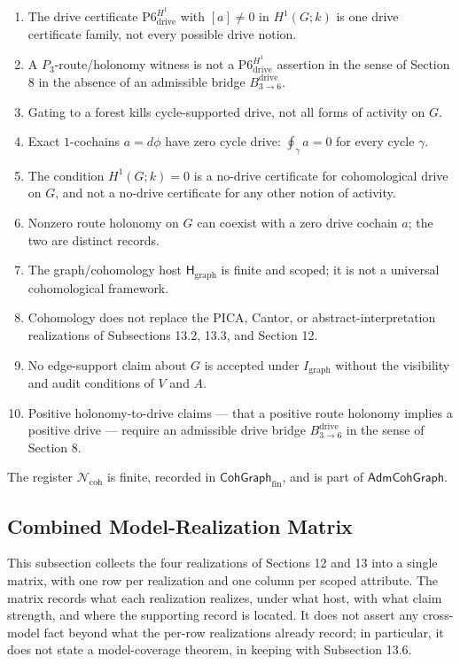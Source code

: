 \documentclass[11pt]{article}
\providecommand{\tightlist}{}
\theoremstyle{definition}
\begin{document}
\begin{enumerate}
\def\labelenumi{\arabic{enumi}.}
\tightlist
\item
  The drive certificate \(\mathrm{P6}_{\mathrm{drive}}^{H^1}\) with \([a]\neq 0\) in \(H^{1}(G;k)\) is one drive certificate family, not every possible drive notion.
\item
  A \(P_{3}\)-route/holonomy witness is not a \(\mathrm{P6}_{\mathrm{drive}}^{H^1}\) assertion in the sense of Section 8 in the absence of an admissible bridge \(B_{3\to 6}^{\mathrm{drive}}\).
\item
  Gating to a forest kills cycle-supported drive, not all forms of activity on \(G\).
\item
  Exact \(1\)-cochains \(a=d\phi\) have zero cycle drive: \(\oint_{\gamma}a=0\) for every cycle \(\gamma\).
\item
  The condition \(H^{1}(G;k)=0\) is a no-drive certificate for cohomological drive on \(G\), and not a no-drive certificate for any other notion of activity.
\item
  Nonzero route holonomy on \(G\) can coexist with a zero drive cochain \(a\); the two are distinct records.
\item
  The graph/cohomology host \(\mathsf H_{\mathrm{graph}}\) is finite and scoped; it is not a universal cohomological framework.
\item
  Cohomology does not replace the PICA, Cantor, or abstract-interpretation realizations of Subsections 13.2, 13.3, and Section 12.
\item
  No edge-support claim about \(G\) is accepted under \(I_{\mathrm{graph}}\) without the visibility and audit conditions of \(V\) and \(A\).
\item
  Positive holonomy-to-drive claims --- that a positive route holonomy implies a positive drive --- require an admissible drive bridge \(B_{3\to 6}^{\mathrm{drive}}\) in the sense of Section 8.
\end{enumerate}

The register \(\mathcal N_{\mathrm{coh}}\) is finite, recorded in \(\mathsf{CohGraph}_{\mathrm{fin}}\), and is part of \(\mathsf{AdmCohGraph}\).

\subsection{Combined Model-Realization Matrix}

This subsection collects the four realizations of Sections 12 and 13 into a single matrix, with one row per realization and one column per scoped attribute. The matrix records what each realization realizes, under what host, with what claim strength, and where the supporting record is located. It does not assert any cross-model fact beyond what the per-row realizations already record; in particular, it does not state a model-coverage theorem, in keeping with Subsection 13.6.
\end{document}
